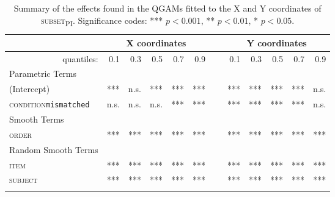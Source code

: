 \begin{table}[p]
\fontsize{9}{10}
\caption{Summary of the effects found in the QGAMs fitted to the X and Y coordinates of \textsc{subset\textsubscript{PI}}. Significance codes: *** $p < 0.001$, ** $p < 0.01$, * $p < 0.05$.}
\label{tab:8.8}
\centering
\begin{tabular}{lrrrrrrrrrrr}
\lsptoprule
~                   & \multicolumn{5}{c}{X coordinates}    & \multicolumn{1}{c}{}                          & \multicolumn{5}{c}{Y coordinates}                               \\
\midrule
\multicolumn{1}{r}{quantiles:}          & 0.1        & 0.3        & 0.5        & 0.7        & 0.9  & ~      & 0.1        & 0.3        & 0.5        & 0.7        & 0.9         \\
\midrule
Parametric Terms    & \textbf{~} & \textbf{~} & \textbf{~} & \textbf{~} & \textbf{~} & \textbf{~} & \textbf{~} & \textbf{~} & \textbf{~} & \textbf{~}  \\
\midrule
(Intercept)         & ***        & n.s.         & ***        & ***        & ***    & ~    & ***        & ***        & ***        & ***        & n.s.          \\
\textsc{condition}\texttt{mismatched} & n.s.       & n.s.          & n.s.        & ***        & *** & ~       & ***       & ***        & ***        & ***        & n.s.         \\
\midrule
Smooth Terms        & \textbf{~} & \textbf{~} & \textbf{~} & \textbf{~} & \textbf{~} & \textbf{~} & \textbf{~} & \textbf{~} & \textbf{~} & \textbf{~}  \\
\midrule
\textsc{order}               & ***        & ***        & ***        & ***        & ***  & ~      & ***        & ***        & ***        & ***        & ***         \\
\midrule
Random Smooth Terms & \textbf{~} & \textbf{~} & \textbf{~} & \textbf{~} & \textbf{~} & \textbf{~} & \textbf{~} & \textbf{~} & \textbf{~} & \textbf{~}  \\
\midrule
\textsc{item}                & ***        & ***        & ***        & ***        & ***  & ~      & ***        & ***        & ***        & ***        & ***         \\
\textsc{subject}             & ***        & ***        & ***        & ***        & ***  & ~      & ***        & ***        & ***        & ***        & ***        \\
\lspbottomrule
\end{tabular}
\end{table}

